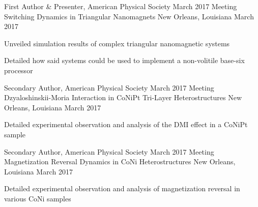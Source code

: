 


\begin{cventries}


\cventry
{First Author \& Presenter, American Physical Society March 2017 Meeting} %
{Switching Dynamics in Triangular Nanomagnets} %
{New Orleans, Louisiana} %
{March 2017} %
{ %
\begin{cvitems}
\item {Unveiled simulation results of complex triangular nanomagnetic systems}
\item {Detailed how said systems could be used to implement a non-volitile base-six processor}
\end{cvitems}
}


\cventry
{Secondary Author, American Physical Society March 2017 Meeting} %
{Dzyaloshinskii-Moria Interaction in CoNiPt Tri-Layer Heterostructures} %
{New Orleans, Louisiana} %
{March 2017} %
{ %
\begin{cvitems}
\item {Detailed experimental observation and analysis of the DMI effect in a CoNiPt sample}
\end{cvitems}
}


\cventry
{Secondary Author, American Physical Society March 2017 Meeting} %
{Magnetization Reversal Dynamics in CoNi Heterostructures} %
{New Orleans, Louisiana} %
{March 2017} %
{ %
\begin{cvitems}
\item {Detailed experimental observation and analysis of magnetization reversal in various CoNi samples}
\end{cvitems}
}



\end{cventries}
